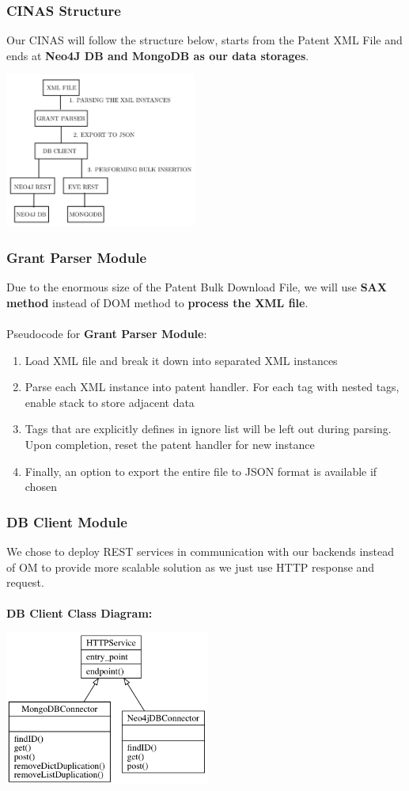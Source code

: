\documentclass{beamer}
\begin{document}
\begin{frame}
\frametitle{CINAS Structure}
Our CINAS will follow the structure below, starts from the Patent XML File and ends at \textbf{Neo4J DB and MongoDB as our data storages}.
\begin{center}
\includegraphics[height=2in]{cinas.png}
\end{center}
\end{frame}

\begin{frame}
\frametitle{Grant Parser Module}
Due to the enormous size of the Patent Bulk Download File, we will use \textbf{SAX method} instead of DOM method to \textbf{process the XML file}.\\~\\
Pseudocode for \textbf{Grant Parser Module}:
\begin{enumerate}
\item Load XML file and break it down into separated XML instances
\item Parse each XML instance into patent handler. For each tag with nested tags, enable stack to store adjacent data
\item Tags that are explicitly defines in ignore list will be left out during parsing. Upon completion, reset the patent handler for new instance
\item Finally, an option to export the entire file to JSON format is available if chosen
\end{enumerate}
\end{frame}

\begin{frame}
\frametitle{DB Client Module}
We chose to deploy REST services in communication with our backends instead of OM to provide more scalable solution as we just use HTTP response and request.\\~\\
\textbf{DB Client Class Diagram:}\\
\begin{center}
\includegraphics[height=2in]{dbclient.png}
\end{center}
\end{frame}
\end{document}
